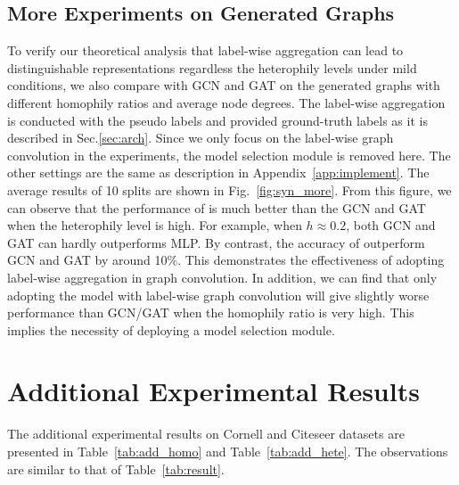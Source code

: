 \subsection{More Experiments on Generated Graphs}
\label{sec:app_syn}
To verify our theoretical analysis that label-wise aggregation can lead to distinguishable representations regardless the heterophily levels under mild conditions, we also compare {\method} with GCN and GAT on the generated graphs with different homophily ratios and average node degrees.
The label-wise aggregation is conducted with the pseudo labels and provided ground-truth labels as it is described in Sec.\ref{sec:arch}. Since we only focus on the label-wise graph convolution in the experiments, the model selection module is removed here. The other settings are the same as description in Appendix~\ref{app:implement}.
The average results of 10 splits are shown in Fig.~\ref{fig:syn_more}. From this figure, we can observe that the performance of {\method} is much better than the GCN and GAT when the heterophily level is high. For example, when $h \approx 0.2$, both GCN and GAT can hardly outperforms MLP. By contrast, the accuracy of {\method} outperform GCN and GAT by around 10\%. This demonstrates the effectiveness of adopting label-wise aggregation in graph convolution. In addition, we can find that only adopting the model with label-wise graph convolution will give slightly worse performance than GCN/GAT when the homophily ratio is very high. This implies the necessity of deploying a model selection module. 


















\section{  Additional Experimental Results} \label{sec:app_result}

{ The additional experimental results on Cornell and Citeseer datasets are presented in Table~\ref{tab:add_homo} and Table~\ref{tab:add_hete}. The observations are similar to that of Table~\ref{tab:result}.}

